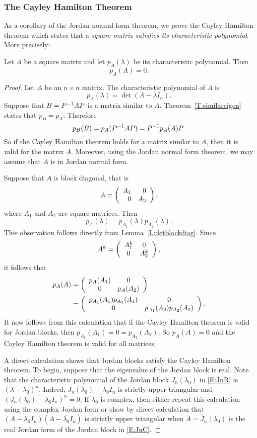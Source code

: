 \documentclass{ximera}
\begin{document}
\subsubsection*{The Cayley Hamilton Theorem}

As a corollary of the Jordan normal form theorem, we prove the Cayley 
Hamilton theorem which states that a {\em square matrix satisfies its 
characteristic polynomial\/}.  More precisely:
\begin{theorem} \label{T:CH} 
Let $A$ be a square matrix and let $p_A(\lambda)$ be 
its characteristic polynomial.  Then
\[
p_A(A) = 0.
\]
\end{theorem}

\begin{proof}  Let $A$ be an $n\times n$ matrix.  The characteristic polynomial of 
$A$ is
\[
p_A(\lambda)=\det(A-\lambda I_n).
\]
Suppose that $B=P^{-1} AP$ is a matrix similar to $A$.  
Theorem~\ref{T:similareigen} states that $p_B=p_A$.  Therefore
\[
p_B(B)= p_A(P^{-1} AP) = P^{-1} p_A(A)P.
\]
So if the Cayley Hamilton theorem holds for a matrix similar to $A$, 
then it is valid for the matrix $A$.  Moreover, using the Jordan normal form 
theorem, we may assume that $A$ is in Jordan normal form.  

Suppose that $A$ is block diagonal, that is 
\[
A = \left(\begin{array}{rr} A_1 & 0\\ 0 &A_2\end{array}\right),
\]
where $A_1$ and $A_2$ are square matrices.  Then 
\[
p_A(\lambda) = p_{A_1}(\lambda)p_{A_2}(\lambda).
\]
This observation follows directly from Lemma~\ref{L:detblockdiag}.  Since
\[
A^k = \left(\begin{array}{cc} A_1^k & 0\\ 0 &A_2^k\end{array}\right),
\]
it follows that 
\begin{align*}
p_A(A) &= \left(\begin{array}{cc} p_A(A_1) & 0\\ 0 &p_A(A_2)\end{array}\right) \\
  &= \left(\begin{array}{cc} p_{A_1}(A_1)p_{A_2}(A_1) & 0\\ 0 &p_{A_1}(A_2)p_{A_2}(A_2)\end{array}\right).
\end{align*}
It now follows from this calculation that if the Cayley Hamilton theorem is 
valid for Jordan blocks, then $p_{A_1}(A_1)=0=p_{A_2}(A_2)$.  So $p_A(A)=0$ 
and the Cayley Hamilton theorem is valid for all matrices.

A direct calculation shows that Jordan blocks satisfy the 
Cayley Hamilton theorem.  To begin, suppose that the eigenvalue of the 
Jordan block is real.  Note that the characteristic polynomial of 
the Jordan block $J_n(\lambda_0)$ in \eqref{E:JnR} is $(\lambda-\lambda_0)^n$.
Indeed, $J_n(\lambda_0)-\lambda_0I_n$ is strictly upper triangular and 
$(J_n(\lambda_0)-\lambda_0I_n)^n=0$.  If $\lambda_0$ is complex, then either
repeat this calculation using the complex Jordan form or show by direct 
calculation that $(A-\lambda_0I_n)(A-\overline{\lambda_0}I_n)$ is strictly 
upper triangular when $A=\widehat{J}_n(\lambda_0)$ is the real Jordan form of 
the Jordan block in \eqref{E:JnC}.  \end{proof}
\end{document}
